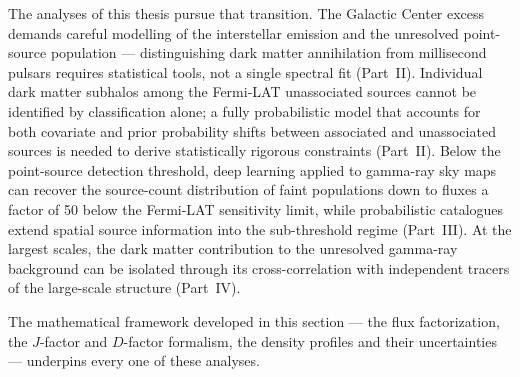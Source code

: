 The analyses of this thesis pursue that transition.
The Galactic Center excess demands careful modelling of the interstellar emission and the unresolved point-source population --- distinguishing dark matter annihilation from millisecond pulsars requires statistical tools, not a single spectral fit (Part~II).
Individual dark matter subhalos among the Fermi-LAT unassociated sources cannot be identified by classification alone; a fully probabilistic model that accounts for both covariate and prior probability shifts between associated and unassociated sources is needed to derive statistically rigorous constraints (Part~II).
Below the point-source detection threshold, deep learning applied to gamma-ray sky maps can recover the source-count distribution of faint populations down to fluxes a factor of 50 below the Fermi-LAT sensitivity limit, while probabilistic catalogues extend spatial source information into the sub-threshold regime (Part~III).
At the largest scales, the dark matter contribution to the unresolved gamma-ray background can be isolated through its cross-correlation with independent tracers of the large-scale structure (Part~IV).

The mathematical framework developed in this section --- the flux factorization, the $J$-factor and $D$-factor formalism, the density profiles and their uncertainties --- underpins every one of these analyses.

